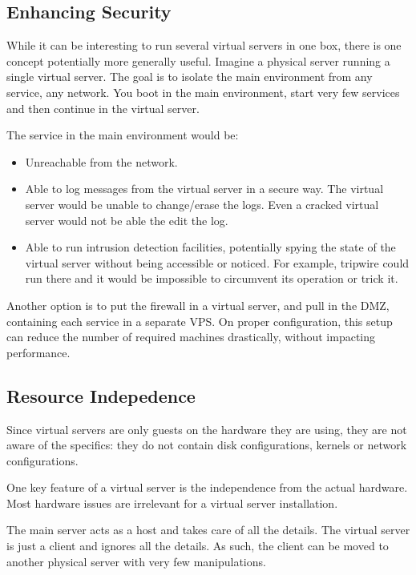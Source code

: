 \subsection{Enhancing Security}

While it can be interesting to run several virtual servers in one box, there is
one concept potentially more generally useful. Imagine a physical server
running a single virtual server. The goal is to isolate the main environment
from any service, any network. You boot in the main environment, start very few
services and then continue in the virtual server.

The service in the main environment would be:

\begin{itemize}
	\item Unreachable from the network.

	\item Able to log messages from the virtual server in a secure way. The
		virtual server would be unable to change/erase the logs. Even a cracked
		virtual server would not be able the edit the log.

	\item Able to run intrusion detection facilities, potentially spying the
		state of the virtual server without being accessible or noticed. For
		example, tripwire could run there and it would be impossible to
		circumvent its operation or trick it.
\end{itemize}

Another option is to put the firewall in a virtual server, and pull in the DMZ,
containing each service in a separate VPS. On proper configuration, this setup
can reduce the number of required machines drastically, without impacting
performance.


\subsection{Resource Indepedence}

Since virtual servers are only guests on the hardware they are using, they are
not aware of the specifics: they do not contain disk configurations, kernels or
network configurations.

One key feature of a virtual server is the independence from the actual
hardware. Most hardware issues are irrelevant for a virtual server
installation.

The main server acts as a host and takes care of all the details. The virtual
server is just a client and ignores all the details. As such, the client can be
moved to another physical server with very few manipulations.

